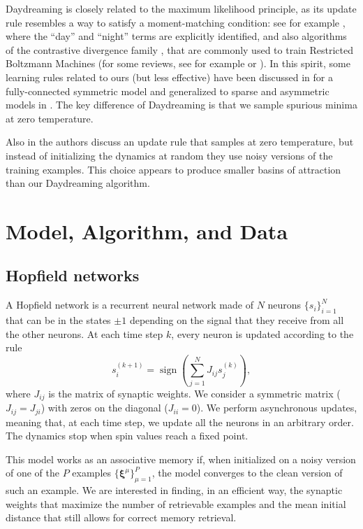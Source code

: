 \documentclass[a4paper]{cas-sc}
\DeclareMathOperator{\sign}{sign}
\newcommand{\bxi}{\boldsymbol{\xi}}
\begin{document}
Daydreaming is closely related to the maximum likelihood principle, as its update rule resembles a way to satisfy a moment-matching condition: see for example \cite{mackay2003information}, where the ``day'' and ``night'' terms are explicitly identified, and also algorithms of the contrastive divergence family \cite{hinton2005contrastive}, that are commonly used to train Restricted Boltzmann Machines (for some reviews, see for example \cite{decelle2021restricted} or \cite{lecun2015deep}). In this spirit, some learning rules related to ours (but less effective) have been discussed in \cite{kojima1995capacity,baldassi2018inverse} for a fully-connected symmetric model and generalized to sparse and asymmetric models in \cite{braunstein2011inference,saglietti2018statistical}. The key difference of Daydreaming is that we sample spurious minima at zero temperature.

Also in \cite{poppel1987dynamical} the authors discuss an update rule that samples at zero temperature, but instead of initializing the dynamics at random they use noisy versions of the training examples. This choice appears to produce smaller basins of attraction than our Daydreaming algorithm.


\section{Model, Algorithm, and Data}
\label{sec:definition}

\subsection{Hopfield networks}

A Hopfield network is a recurrent neural network made of $N$ neurons $\{s_i\}_{i=1}^N$ that can be in the states $\pm 1$ depending on the signal that they receive from all the other neurons. At each time step $k$, every neuron is updated according to the rule
\begin{equation}
    s_i^{(k+1)} = \sign \left( \sum_{j=1}^N J_{ij} s_j^{(k)}\right),
    \label{eq:update_rule}
\end{equation}
where $J_{ij}$ is the matrix of synaptic weights. We consider a symmetric matrix ($J_{ij}=J_{ji}$) with zeros on the diagonal ($J_{ii}=0$). We perform asynchronous updates, meaning that, at each time step, we update all the neurons  in an arbitrary order. The dynamics stop when spin values reach a fixed point.

This model works as an associative memory if, when initialized on a noisy version of one of the $P$ examples $\{\bxi^{\mu} \}_{\mu=1}^P$, the model converges to the clean version of such an example. We are interested in finding, in an efficient way, the synaptic weights that maximize the number of retrievable examples and the mean initial distance that still allows for correct memory retrieval.
\end{document}
